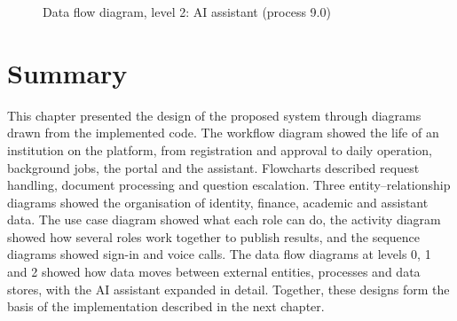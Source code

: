 {
  \begin{figure}[!htbp]
    \centering
    \caption{Data flow diagram, level 2: AI assistant (process 9.0)}
    \label{fig:dfd2}
  \end{figure}
}

\section{Summary}
This chapter presented the design of the proposed system through diagrams drawn from the implemented code. The workflow diagram showed the life of an institution on the platform, from registration and approval to daily operation, background jobs, the portal and the assistant. Flowcharts described request handling, document processing and question escalation. Three entity--relationship diagrams showed the organisation of identity, finance, academic and assistant data. The use case diagram showed what each role can do, the activity diagram showed how several roles work together to publish results, and the sequence diagrams showed sign-in and voice calls. The data flow diagrams at levels 0, 1 and 2 showed how data moves between external entities, processes and data stores, with the AI assistant expanded in detail. Together, these designs form the basis of the implementation described in the next chapter.
